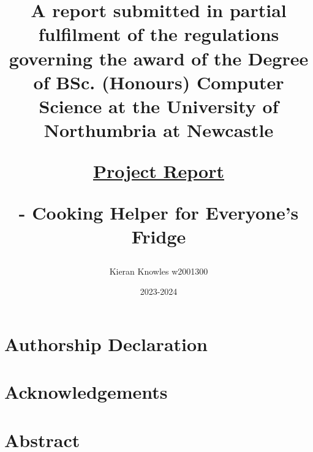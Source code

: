 \documentclass[11pt, twoside, a4paper]{report}
\begin{document}

\title{
    A report submitted in partial fulfilment of the regulations governing the award of the Degree of
    BSc. (Honours) Computer Science at the University of Northumbria at Newcastle

    \underline{Project Report}

    \chef{} - Cooking Helper for Everyone's Fridge
}
\author{Kieran Knowles w2001300}
\date{2023-2024}
\maketitle


\chapter*{Authorship Declaration}


\chapter*{Acknowledgements}

\chapter*{Abstract}
\end{document}

